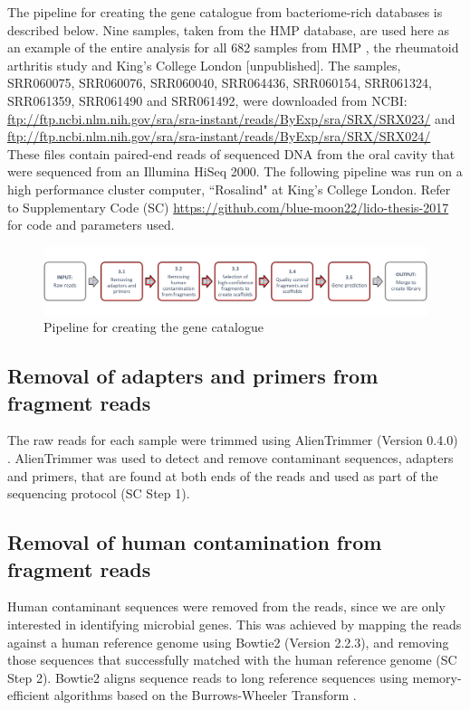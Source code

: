 \documentclass[a4paper]{article}
\begin{document}
The pipeline for creating the gene catalogue from bacteriome-rich databases is described below. Nine samples, taken from the HMP database, are used here as an example of the entire analysis for all 682 samples from HMP \cite{human_microbiome_project_consortium_framework_2012}, the rheumatoid arthritis study \cite{zhang_oral_2015} and King's College London [unpublished]. The samples, SRR060075, SRR060076, SRR060040, SRR064436, SRR060154, SRR061324, SRR061359, SRR061490 and SRR061492, were downloaded from NCBI: \url{ftp://ftp.ncbi.nlm.nih.gov/sra/sra-instant/reads/ByExp/sra/SRX/SRX023/} and \url{ftp://ftp.ncbi.nlm.nih.gov/sra/sra-instant/reads/ByExp/sra/SRX/SRX024/}
These files contain paired-end reads of sequenced DNA from the oral cavity that were sequenced from an Illumina HiSeq 2000. The following pipeline was run on a high performance cluster computer, ``Rosalind" at King's College London. Refer to Supplementary Code (SC) \url{https://github.com/blue-moon22/lido-thesis-2017} for code and parameters used.

\begin{figure}[H]
\centering
\includegraphics[width=\linewidth,valign=t]{workflow.png}
\caption{\label{fig:workflow} Pipeline for creating the gene catalogue}
\end{figure}

\subsection{Removal of adapters and primers from fragment reads}
The raw reads for each sample were trimmed using AlienTrimmer (Version 0.4.0) \cite{criscuolo_alientrimmer:_2013}. AlienTrimmer was used to detect and remove contaminant sequences, adapters and primers, that are found at both ends of the reads and used as part of the sequencing protocol (SC Step 1).

\subsection{Removal of human contamination from fragment reads}
Human contaminant sequences were removed from the reads, since we are only interested in identifying microbial genes. This was achieved by mapping the reads against a human reference genome using Bowtie2 (Version 2.2.3), and removing those sequences that successfully matched with the human reference genome (SC Step 2). Bowtie2 aligns sequence reads to long reference sequences using memory-efficient algorithms based on the Burrows-Wheeler Transform \cite{langmead_aligning_2010}.
\end{document}

